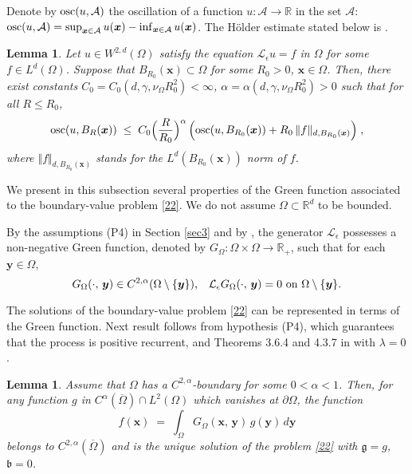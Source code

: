 \documentclass[reqno]{amsart}
\newtheorem{lemma}[theorem]{Lemma}
\newcounter{as}[section]
\newcommand{\mc}[1]{{\mathcal #1}}
\newcommand{\mf}[1]{{\mathfrak #1}}
\newcommand{\bb}[1]{{\mathbb #1}}
\newcommand{\bs}[1]{{\boldsymbol #1}}
\newcommand{\<}{\langle}
\renewcommand{\>}{\rangle}
\begin{document}
Denote by $\text{\rm osc}(u,\mc A)$ the oscillation of a function
$u:\mc A \to \bb R$ in the set $\mc A$: $\text{\rm osc}(u,\mc A) =
\sup_{\bs x \in \mc A} u(\bs x) - \inf_{\bs x \in \mc A} u(\bs x)$.
The H\"older estimate stated below is \cite[Corollary 9.24]{gt}.

\begin{lemma}
\label{7-l2}
Let $u\in W^{2,d} (\Omega)$ satisfy the equation $\mc L_\epsilon u =
f$ in $\Omega$ for some $f\in L^d(\Omega)$.  Suppose that $B_{R_0}(\bs
x) \subset \Omega$ for some $R_0>0$, $\bs x\in\Omega$.  Then, there
exist constants $C_0 = C_0(d, \gamma, \nu_{\Omega} R^2_0)<\infty$,
$\alpha = \alpha(d, \gamma, \nu_{\Omega} R^2_0)>0$ such that for all
$R\le R_0$,
\begin{equation*}
\text{\rm osc} (u,B_R(\bs x)) \;\le\; C_0 \Big(\frac{R}{R_0}\Big)^\alpha
\, \Big( \text{\rm osc} (u,B_{R_0}(\bs x)) + R_0 \, \Vert f\Vert_{d,
  B_{R_0}(\bs x)} \Big)\;,
\end{equation*}
where $\Vert f\Vert_{d, B_{R_0}(\bs x)}$ stands for the
$L^d(B_{R_0}(\bs x))$ norm of $f$.
\end{lemma}

\smallskip{}  We present in this
subsection several properties of the Green function associated to the
boundary-value problem \eqref{22}. We do not assume
$\Omega\subset\bb R^d$ to be bounded.

By the assumptions (P4) in Section \ref{sec3} and by
\cite[Theorems 6.1.3, 4.2.1 (ii), 4.2.5]{p95}, the generator $\mathcal{L}_{\epsilon}$ possesses a
non-negative Green function, denoted by $G_{\Omega}: \Omega \times
\Omega \to \bb R_+$, such that for each $\bs y\in\Omega$,
\begin{equation}
\label{7-13}
\text{$G_{\Omega}(\cdot,\,\bs{y}) \in
C^{2,\alpha}(\Omega\setminus \{\bs y\})$,\quad $\mathcal{L}_{\epsilon}
G_{\Omega}(\cdot,\,\bs{y}) = 0$ on $\Omega\setminus \{\bs y\}$.}
\end{equation}

The solutions of the boundary-value problem \eqref{22} can be
represented in terms of the Green function.  Next result follows from
hypothesis (P4), which guarantees that the process is positive
recurrent, and Theorems 3.6.4 and 4.3.7 in \cite{p95} with
$\lambda=0$.

\begin{lemma}
\label{7-l14}
Assume that $\Omega$ has a $C^{2,\alpha}$-boundary for some
$0<\alpha<1$. Then, for any function $g$ in
$C^\alpha(\overline{\Omega}) \cap L^2(\Omega)$ which vanishes at
$\partial \Omega$, the function
\begin{equation*}
f(\bs{x})\;=\;\int_{\Omega} G_{\Omega}(\bs{x},\,\bs{y}) \,
g(\bs{y}) \, d\bs{y}
\end{equation*}
belongs to $C^{2,\alpha}(\overline{\Omega})$ and is the unique
solution of the problem \eqref{22} with $\mf g= g$, $\mf b=0$.
\end{lemma}
\end{document}
